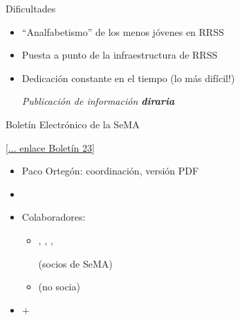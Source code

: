 \begin{frame}{Dificultades}
  \begin{itemize}
  \item ``Analfabetismo'' de los menos jóvenes en RRSS
  \item Puesta a punto de la infraestructura de RRSS
  \item Dedicación constante en el tiempo (lo más difícil!)
    \begin{center}
      \textit{Publicación de información \textbf{diraria}}
    \end{center}
  \end{itemize}
\end{frame}

\begin{frame}
\end{frame}

\begin{frame}{Boletín Electrónico de la SeMA}
  \begin{flushright}
  \href{https://www.sema.org.es/images/boletines/boletin23/23}{[... enlace Boletín 23]}
\end{flushright}
  \begin{itemize}
  \item Paco Ortegón: coordinación, versión PDF
  \item {}
  \item Colaboradores:
    \begin{itemize}
    \item {},
      ,
      ,
      \par
      \begin{flushright}\small
        (socios de SeMA)
      \end{flushright}
    \item \textit{}
      \par
      \begin{flushright}\small
      (no socia)
    \end{flushright}
    \end{itemize}
  \item<3>$+$ 
  \end{itemize}
\end{frame}

